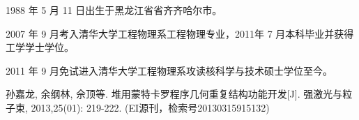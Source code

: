 \begin{resume}


  1988 年 5 月 11 日出生于黑龙江省省齐齐哈尔市。
  
  2007 年 9 月考入清华大学工程物理系工程物理专业，2011年 7 月本科毕业并获得工学学士学位。
  
  2011 年 9 月免试进入清华大学工程物理系攻读核科学与技术硕士学位至今。


  \begin{enumerate}[{[}1{]}]
  \item 孙嘉龙, 余纲林, 佘顶等. 堆用蒙特卡罗程序几何重复结构功能开发[J]. 强激光与粒子束, 2013,25(01): 219-222.
  (EI源刊，检索号20130315915132)
  \end{enumerate}

\end{resume}

